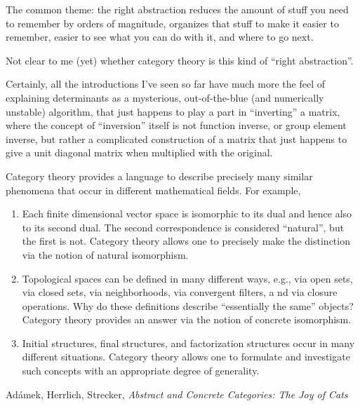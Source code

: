 \documentclass[11pt,openany]{book}
\begin{document}
The common theme: the right abstraction reduces 
the amount of stuff you need to remember by orders of magnitude,
organizes that stuff to make it easier to remember,
easier to see what you can do with it,
and where to go next.

Not clear to me (yet) whether category theory is this kind of
``right abstraction''. 

Certainly, all the introductions I've seen so far have much more
the feel of explaining determinants as a mysterious,
out-of-the-blue (and numerically unstable) algorithm,
that just happens to play a part in ``inverting'' a matrix,
where the concept of ``inversion'' itself is not 
function inverse, or group element inverse,
but rather a complicated construction of a matrix that
just happens to give a unit diagonal matrix when multiplied with 
the original.

\setcounter{currentlevel}{\value{baseSectionLevel}}
\label{sec:Why?}

\setlength{\epigraphwidth}{0.95\linewidth}

\begin{boxquote}
Category theory provides a language 
to describe precisely many similar phenomena that
occur in different mathematical fields. For example,
\begin{enumerate}
  \item  Each finite dimensional vector space is 
  isomorphic to its dual and hence also to its
second dual. The second correspondence is considered 
``natural'', but the first is
not. Category theory allows one to precisely 
make the distinction via the notion
of natural isomorphism.
\item Topological spaces can be defined in many different ways, 
e.g., via open sets, via
closed sets, via neighborhoods, via convergent filters, a
nd via closure operations.
Why do these definitions describe 
``essentially the same'' objects? Category theory
provides an answer via the notion of concrete isomorphism.
\item Initial structures, final structures, 
and factorization structures occur in many different
situations. Category theory allows one to formulate 
and investigate such
concepts with an appropriate degree of generality.
\end{enumerate}
\tcblower
{Ad\'{a}mek, Herrlich, Strecker, 
\textit{Abstract and Concrete Categories:
The Joy of Cats}~\cite{adamek_herrlich_strecker_1990}}
\end{boxquote}
\end{document}
